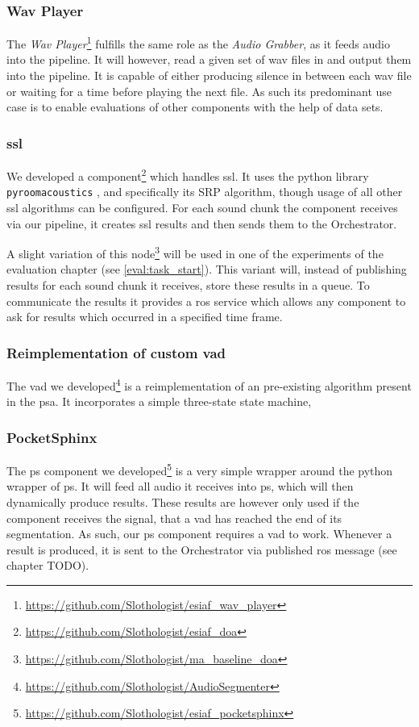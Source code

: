 \subsubsection{Wav Player}
\label{main:components:wav}
The \textit{Wav Player}\footnote{\url{https://github.com/Slothologist/esiaf_wav_player}} fulfills the same role as the \textit{Audio Grabber}, as it feeds audio into the pipeline.
It will however, read a given set of wav files in and output them into the pipeline.
It is capable of either producing silence in between each wav file or waiting for a time before playing the next file.
As such its predominant use case is to enable evaluations of other components with the help of data sets.

\subsubsection{\gls{ssl}}
\label{main:components:ssl}
We developed a component\footnote{\url{https://github.com/Slothologist/esiaf_doa}} which handles \gls{ssl}.
It uses the python library \texttt{pyroomacoustics} \cite{pyroomacoustics}, and specifically its SRP algorithm, though usage of all other \gls{ssl} algorithms can be configured.
For each sound chunk the component receives via our pipeline, it creates \gls{ssl} results and then sends them to the Orchestrator.

A slight variation of this node\footnote{\url{https://github.com/Slothologist/ma_baseline_doa}}  will be used in one of the experiments of the evaluation chapter (see \ref{eval:task_start}).
This variant will, instead of publishing results for each sound chunk it receives, store these results in a queue.
To communicate the results it provides a \gls{ros} service which allows any component to ask for results which occurred in a specified time frame.

\subsubsection{Reimplementation of custom \gls{vad}}
\label{main:components:vad}
The \gls{vad} we developed\footnote{\url{https://github.com/Slothologist/AudioSegmenter}} is a reimplementation of an pre-existing algorithm present in the \gls{psa}.
It incorporates a simple three-state state machine, 

\subsubsection{PocketSphinx}
\label{main:components:ps}
The \gls{ps} component we developed\footnote{\url{https://github.com/Slothologist/esiaf_pocketsphinx}} is a very simple wrapper around the python wrapper of \gls{ps}.
It will feed all audio it receives into \gls{ps}, which will then dynamically produce results.
These results are however only used if the component receives the signal, that a \gls{vad} has reached the end of its segmentation.
As such, our \gls{ps} component requires a \gls{vad} to work.
Whenever a result is produced, it is sent to the Orchestrator via published \gls{ros} message (see chapter TODO).%


